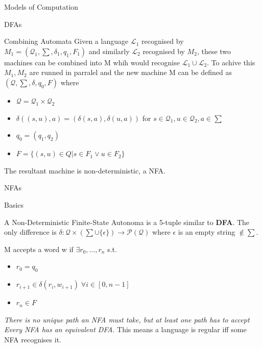 \documentclass[12pt, letterpaper]{article}
\begin{document}
\begin{section}{Models of Computation}
\begin{subsection}{DFAs}
\begin{subsubsection}{Combining Automata}
      Given a language \(\mathscr{L}_{1}\) recognised by
      \(M_{1} = (\mathcal{Q}_{1}, \sum, \delta_{1}, q_{1}, F_{1})\) and
      similarly \(\mathscr{L}_{2}\) recognised by \(M_{2}\), these two machines
      can be combined into M whih would recognise
      \(\mathscr{L}_{1} \cup \mathscr{L}_{2}\). To achive this
      \(M_{1}, M_{2}\) are runned in parralel and the new machine M can be
      defined as \((\mathcal{Q}, \sum, \delta, q_{0}, F)\) where
      \begin{itemize}
        \item \(\mathcal{Q} = \mathcal{Q}_{1} \times \mathcal{Q}_{2}\)
        \item \(\delta((s, u), a) = (\delta(s, a), \delta(u, a))\) for
              \(s \in \mathcal{Q}_{1}, u \in \mathcal{Q}_{2}, a \in \sum\)
        \item \(q_{0} = (q_{1}, q_{2})\)
        \item \(F = \{ (s, u) \in Q | s \in F_{1} \lor u \in F_{2} \}\)
      \end{itemize}

      The resultant machine is non-deterministic, a NFA.\

    \end{subsubsection}

  \end{subsection}

  \begin{subsection}{NFAs}

    \begin{subsubsection}{Basics}

      A Non-Deterministic Finite-State Autonoma is a 5-tuple similar to
      \textbf{DFA}. The only difference is \(\delta: \mathcal{Q} \times
      (\sum \cup \{ \epsilon \}) \to \mathscr{P}(\mathcal{Q})\) where
      \(\epsilon\) is an empty string \(\notin \sum\).

      M accepts a word w if \(\exists r_{0}, \dots , r_{n}\) s.t.
      \begin{itemize}
        \item \(r_{0} = q_{0}\)
        \item
        \(r_{i + 1} \in \delta(r_{i}, w_{i + 1}) \; \forall i \in [0, n - 1]\)
        \item \(r_{n} \in F\)
      \end{itemize}

      \emph{There is no unique path an NFA must take, but at least one path has
        to accept} \\
      \emph{Every NFA has an equivalent DFA}. This means a language is regular
      iff some NFA recognises it.
    

\end{subsubsection}
\end{subsection}
\end{section}
\end{document}
